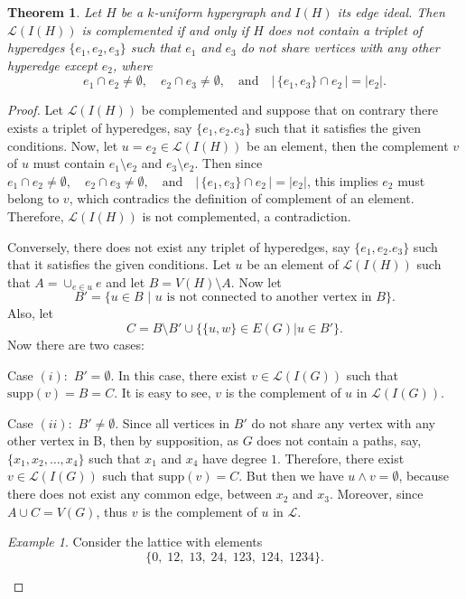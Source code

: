 \documentclass[11pt]{amsart}
\newcommand{\LC}{\mathcal{L}}
\newcommand{\supp}{\mathrm{supp}}
\theoremstyle{plain}
\numberwithin{lemma}{\DefaultNumberTheoremWithin}
\numberwithin{claim}{\DefaultNumberTheoremWithin}
\newtheorem{theorem}{Theorem}
\numberwithin{theorem}{\DefaultNumberTheoremWithin}
\numberwithin{corollary}{\DefaultNumberTheoremWithin}
\numberwithin{proposition}{\DefaultNumberTheoremWithin}
\numberwithin{conjecture}{\DefaultNumberTheoremWithin}
\theoremstyle{definition}
\numberwithin{definition}{\DefaultNumberTheoremWithin}
\theoremstyle{definition}
\numberwithin{question}{\DefaultNumberTheoremWithin}
\theoremstyle{definition}
\numberwithin{problem}{\DefaultNumberTheoremWithin}
\theoremstyle{remark}
\numberwithin{remark}
     {\DefaultNumberTheoremWithin}
\theoremstyle{remark}
\newtheorem{example}{Example}
\numberwithin{example}{\DefaultNumberTheoremWithin}
\begin{document}
\begin{theorem}
     Let $H$ be a $k$-uniform hypergraph and $I(H)$ its edge ideal. Then $\LC(I(H))$ is complemented if and only if $H$ does not contain a triplet of hyperedges $\{e_1, e_2, e_3\}$ such that $e_1$ and $e_3$ do not share vertices with any other hyperedge except $e_2$, where 
\[
e_1 \cap e_2 \neq \emptyset, \quad e_2 \cap e_3 \neq \emptyset, \quad \text{and} \quad |\,\{e_1, e_3\} \cap e_2\,| = |e_2|.
\]
\end{theorem}
\begin{proof}
    Let $\LC(I(H))$ be complemented and suppose that on contrary there exists a triplet of hyperedges, say $\{e_1, e_2. e_3\}$ such that it satisfies the given conditions. Now, let $u=e_2 \in \LC(I(H))$ be an element, then the complement $v$ of $u$ must contain $e_1\setminus e_2$ and $e_3\setminus e_2$. Then since $e_1 \cap e_2 \neq \emptyset, \quad e_2 \cap e_3 \neq \emptyset, \quad \text{and} \quad |\,\{e_1, e_3\} \cap e_2\,| = |e_2|$, this implies $e_2$ must belong to $v$, which contradics the definition of complement of an element. Therefore, $\LC(I(H))$ is not complemented, a contradiction.

    Conversely, there does not exist any triplet of hyperedges, say $\{e_1, e_2. e_3\}$ such that it satisfies the given conditions. Let $u$ be an element of $\LC(I(H))$ such that $A = \cup_{e\in u}e$ and let $B=V(H)\setminus A$. Now let 
    $$B'=\{u \in B \,\,|\,\, u \text{ is not connected to another vertex in } B\}.$$ 
    Also, let $$C= B\setminus B' \cup \{\{u,w\}\in E(G) | u\in B'\}.$$
    Now there are two cases:

    Case $(i):$ $B'=\emptyset $. In this case, there exist $v \in \mathcal{L}(I(G))$ such that $\supp(v)=B=C$. It is easy to see, $v$ is the complement of $u$ in $\mathcal{L}(I(G))$.

    Case $(ii):$ $B'\not=\emptyset $. Since all vertices in $B'$ do not share any vertex with any other vertex in B, then by supposition, as $G$ does not contain a paths, say, $\{x_1,x_2, \ldots, x_4\}$ such that $x_1$ and $x_4$ have degree $1$. Therefore, there exist $v \in \mathcal{L}(I(G))$  such that $\supp(v)=C$. But then we have $u \wedge v = \emptyset$, because there does not exist any common edge, between $x_2$ and $x_3$. Moreover, since $A \cup C = V(G)$, thus $v$ is the complement of $u$ in $\mathcal{L}$.

\begin{example}
Consider the lattice with elements
\[
\{0,\;12,\;13,\;24,\;123,\;124,\;1234\}.
\]


\end{example}
\end{proof}
\end{document}
